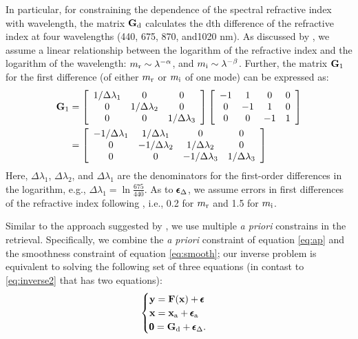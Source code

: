 In particular, for constraining the dependence of the spectral
refractive index with wavelength, the matrix $\mathbf{G}_\text{d}$ calculates the dth
difference of the refractive index at four wavelengths (440, 675, 870,
and1020 nm). As discussed by \citet{Dubovik00a}, we assume a linear
relationship between the logarithm of the refractive index and the
logarithm of the wavelength: $m_\text{r} \sim \lambda^{-\alpha}$, and
$m_\text{i} \sim \lambda^{-\beta}$. Further, the matrix $\mathbf{G}_1$  for 
the first difference (of either $m_\text{r}$ or $m_\text{i}$ of one mode) 
can be expressed as:
\begingroup
\allowdisplaybreaks
\begin{align}
\mathbf{G}_1 
&= 
\left[
    \begin{array}{ccc}
    1/{\Delta\lambda_1} & 0 & 0 \\
    0 & 1/{\Delta\lambda_2} & 0 \\
    0 & 0 & 1/{\Delta\lambda_3}  
    \end{array} 
\right] 
\left[
    \begin{array}{cccc}
    -1 & 1 & 0 & 0 \\
    0 & -1 & 1 & 0 \\
    0 & 0 & -1 & 1
    \end{array} 
\right] 
\nonumber \\
&= 
\left[
    \begin{array}{cccc}
    -1/{\Delta\lambda_1} & 1/{\Delta\lambda_1} & 0 & 0 \\
    0 & -1/{\Delta\lambda_2} & 1/{\Delta\lambda_2} & 0 \\
    0 & 0 & -1/{\Delta\lambda_3} & 1/{\Delta\lambda_3}
    \end{array} 
\right]
\end{align}
\endgroup
Here, $\Delta\lambda_1$, $\Delta\lambda_2$, and $\Delta\lambda_1$ are
the denominators for the first-order differences in the logarithm, e.g.,
$\Delta\lambda_1=\ln{\frac{675}{440}}$. As to $\pmb{\epsilon}_\Delta$, we assume 
errors in first differences of the refractive index following 
\citet{Dubovik00a}, i.e., 0.2 for $m_\text{r}$ and 1.5 for $m_\text{i}$.

Similar to the approach suggested by \citet{Dubovik00a}, we use
multiple \textit{a priori} constrains in the retrieval.  Specifically, 
we combine the \textit{a priori} constraint of equation \eqref{eq:ap} 
and the smoothness constraint of equation \eqref{eq:smooth}; 
our inverse problem is equivalent to solving the following set of three
equations (in contast to \eqref{eq:inverse2} that has two
equations):
\begin{equation}
\begin{cases}
\mathbf{y} = \mathbf{F}(\mathbf{x}) + \pmb{\epsilon}  \\
\mathbf{x} = \mathbf{x}_\text{a} + \pmb{\epsilon}_\text{a} \\
\pmb{0} = \mathbf{G}_\text{d}+\pmb{\epsilon}_\Delta.
\end{cases}
\label{eq:inverse3}
\end{equation}

